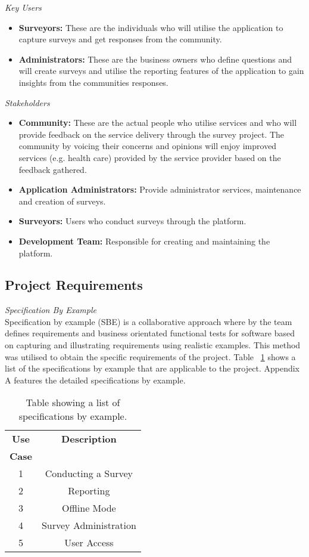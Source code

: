 \documentclass[12pt]{witseiepaper}
\begin{document}
\emph{Key Users} 
\begin{itemize}
  \item \textbf{Surveyors:} These are the individuals who will utilise the application to capture surveys and get responses from the community.
  \item \textbf{Administrators:} These are the business owners who define questions and will create surveys and utilise the reporting features of the application to gain insights from the communities responses.
\end{itemize}

\emph{Stakeholders} 
\begin{itemize}
  \item \textbf{Community:} These are the actual people who utilise services and who will provide feedback on the service delivery through the survey project. The community by voicing their concerns and opinions will enjoy improved services (e.g. health care) provided by the service provider based on the feedback gathered.
  \item \textbf{Application Administrators:} Provide administrator services, maintenance and creation of surveys.
  \item \textbf{Surveyors:} Users who conduct surveys through the platform.
  \item \textbf{Development Team:} Responsible for creating and maintaining the platform. 
\end{itemize}


\subsection{Project Requirements}
\emph{Specification By Example}\\
Specification by example (SBE) is a collaborative approach where by the team defines requirements and business orientated functional tests for software based on capturing and illustrating requirements using realistic examples. This method was utilised to obtain the specific requirements of the project.
Table ~\ref{tbl:use} shows a list of the specifications by example that are applicable to the project. Appendix A features the detailed specifications by example.

\begin{table}[htb] \caption{Table showing a list of specifications by example.} \label{tbl:use} 
    \begin{center}
  \begin{tabular}
    {|c|c|} \hline \textbf{Use} &\textbf{Description}\\
    \textbf{Case} &\\
    \hline 1 &Conducting a Survey\\
    \hline 2 &Reporting\\
    \hline 3 &Offline Mode\\
    \hline 4 &Survey Administration\\
    \hline 5 &User Access\\
    \hline 
  \end{tabular}
      \end{center}
\end{table}
\end{document}
